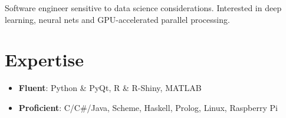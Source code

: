 \documentclass[11pt,a4paper,sans]{moderncv}        %
\begin{document}
\makecvtitle

\small{Software engineer sensitive to data science considerations. Interested in deep learning, neural nets and GPU-accelerated parallel processing.}

\section{Expertise}
  \begin{itemize}
   \item{
     \textbf{Fluent}{: Python \& PyQt, R \& R-Shiny, MATLAB}
      }
   \item{
     \textbf{Proficient}{: C/C\#/Java, Scheme, Haskell, Prolog, Linux, Raspberry Pi}
   }
 \end{itemize}

 

\end{document}
